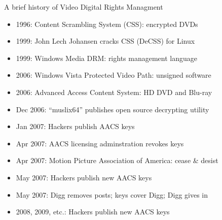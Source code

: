 \documentclass{beamer}
\begin{document}
\begin{frame}{A brief history of Video Digital Rights Managment}
\begin{itemize}
\item 1996: Content Scrambling System (CSS): encrypted DVDs
\item 1999: John Lech Johansen cracks CSS (DeCSS) for Linux
\item 1999: Windows Media DRM: rights management language
\item 2006: Windows Vista Protected Video Path: unsigned software
\item 2006: Advanced Access Content System: HD DVD and Blu-ray
\item Dec 2006: ``muslix64'' publishes open source decrypting utility
\item Jan 2007: Hackers publish AACS keys
\item Apr 2007: AACS licensing adminstration revokes keys
\item Apr 2007: Motion Picture Association of America: cease \& desist
\item May 2007: Hackers publish new AACS keys 
\item May 2007: Digg removes posts; keys cover Digg; Digg gives in
\item 2008, 2009, etc.: Hackers publish new AACS keys
\end{itemize}
\end{frame}
\end{document}
